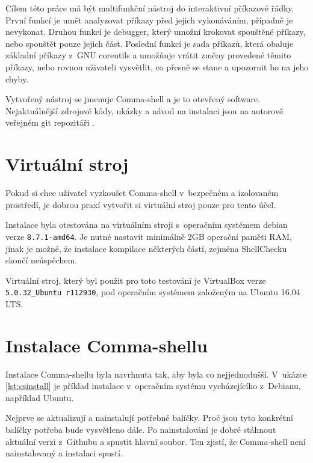 \documentclass[thesis=M,czech]{FITthesis}[2012/06/26]
\begin{document}
Cílem této práce má být multifunkční nástroj do interaktivní příkazové řádky. První funkcí je umět analyzovat příkazy před jejich vykonáváním, případně je nevykonat. Druhou funkcí je debugger, který umožní krokovat spouštěné příkazy, nebo spouštět pouze jejich část. Poslední funkcí je sada příkazů, která obaluje základní příkazy z~GNU coreutils a umožňuje vrátit změny provedené těmito příkazy, nebo rovnou uživateli vysvětlit, co přesně se stane a upozornit ho na jeho chyby.

Vytvořený nástroj se jmenuje Comma-shell a je to otevřený software. Nejaktuálnější zdrojové kódy, ukázky a návod na instalaci jsou na autorově veřejném git repozitáři \cite{commash}.

%
\section{Virtuální stroj}

Pokud si chce uživatel vyzkoušet Comma-shell v~bezpečném a izolovaném prostředí, je dobrou praxí vytvořit si virtuální stroj pouze pro tento účel.

Instalace byla otestována na virtuálním stroji s~operačním systémem debian verze \texttt{8.7.1-amd64}. Je nutné nastavit minimálně 2GB operační paměti RAM, jinak je možné, že instalace kompilace některých částí, zejména ShellChecku skončí neúspěchem.

Virtuální stroj, který byl použit pro toto testování je VirtualBox verze \texttt{5.0.32\_Ubuntu r112930}, pod operačním systémem založeným na Ubuntu 16.04 LTS.




\section{Instalace Comma-shellu}

Instalace Comma-shellu byla navrhnuta tak, aby byla co nejjednodušší. V~ukázce \ref{lst:csinstall} je příklad instalace v~operačním systému vycházejícího z~Debianu, například Ubuntu.

Nejprve se aktualizují a nainstalují potřebné balíčky. Proč jsou tyto konkrétní balíčky potřeba bude vysvětleno dále. Po nainstalování je dobré stáhnout aktuální verzi z~Githubu a spustit hlavní soubor. Ten zjistí, že Comma-shell není nainstalovaný a instalaci spustí.
\end{document}
